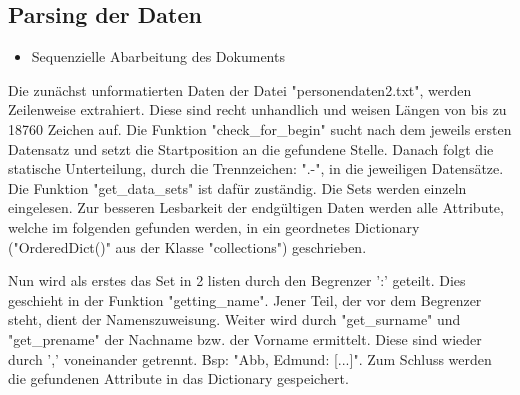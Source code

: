 \subsection{Parsing der Daten}
 \label{subsec:Parsing der Daten}

\begin{itemize}
 \item Sequenzielle Abarbeitung des Dokuments
\end{itemize}

Die zunächst unformatierten Daten der Datei "{}personendaten2.txt"{}, werden Zeilenweise extrahiert. Diese sind recht unhandlich und weisen Längen von bis zu 18760 Zeichen auf. Die Funktion "{}check\_for\_begin"{} sucht nach dem jeweils ersten Datensatz und setzt die Startposition an die gefundene Stelle. Danach folgt die statische Unterteilung, durch die Trennzeichen: "{}.-"{}, in die jeweiligen Datensätze. Die Funktion "{}get\_data\_sets"{} ist dafür zuständig. Die Sets werden einzeln eingelesen. Zur besseren Lesbarkeit der endgültigen Daten werden alle Attribute, welche im folgenden gefunden werden, in ein geordnetes Dictionary ("{}OrderedDict()"{} aus der Klasse "{}collections"{}) geschrieben.

Nun wird als erstes das Set in 2 listen durch den Begrenzer '{}:'{} geteilt. Dies geschieht in der Funktion "{}getting\_name"{}. Jener Teil, der vor dem Begrenzer steht, dient der Namenszuweisung. Weiter wird durch "{}get\_surname"{} und "{}get\_prename"{} der Nachname bzw. der Vorname ermittelt. Diese sind wieder durch '{},'{} voneinander getrennt. Bsp: "{}Abb, Edmund: [...]"{}. Zum Schluss werden die gefundenen Attribute in das Dictionary gespeichert.

